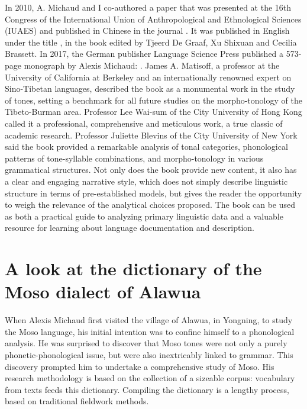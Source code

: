 In 2010, A. Michaud and I co-authored a paper that was presented at the 16th Congress of the International Union of Anthropological and Ethnological Sciences (IUAES) and published in Chinese in the journal . It was published in English under the title , in the book  edited by Tjeerd De Graaf, Xu Shixuan and Cecilia Brassett. In 2017, the German publisher Language Science Press published a 573-page monograph by Alexis Michaud: \emph{}. James A. Matisoff, a professor at the University of California at Berkeley and an internationally renowned expert on Sino-Tibetan languages, described the book as a monumental work in the study of tones, setting a benchmark for all future studies on the morpho-tonology of the Tibeto-Burman area. Professor Lee Wai-sum of the City University of Hong Kong called it a professional, comprehensive and meticulous work, a true classic of academic research. Professor Juliette Blevins of the City University of New York said the book provided a remarkable analysis of tonal categories, phonological patterns of tone-syllable combinations, and morpho-tonology in various grammatical structures. Not only does the book provide new content, it also has a clear and engaging narrative style, which does not simply describe linguistic structure in terms of pre-established models, but gives the reader the opportunity to weigh the relevance of the analytical choices proposed. The book can be used as both a practical guide to analyzing primary linguistic data and a valuable resource for learning about language documentation and description.

\section*{A look at the dictionary of the Moso dialect of Alawua}

When Alexis Michaud first visited the village of Alawua, in Yongning, to study the Moso language, his initial intention was to confine himself to a phonological analysis. He was surprised to discover that Moso tones were not only a purely phonetic-phonological issue, but were also inextricably linked to grammar. This discovery prompted him to undertake a comprehensive study of Moso. His research methodology is based on the collection of a sizeable corpus: vocabulary from texts feeds this dictionary. Compiling the dictionary is a lengthy process, based on traditional fieldwork methods.

